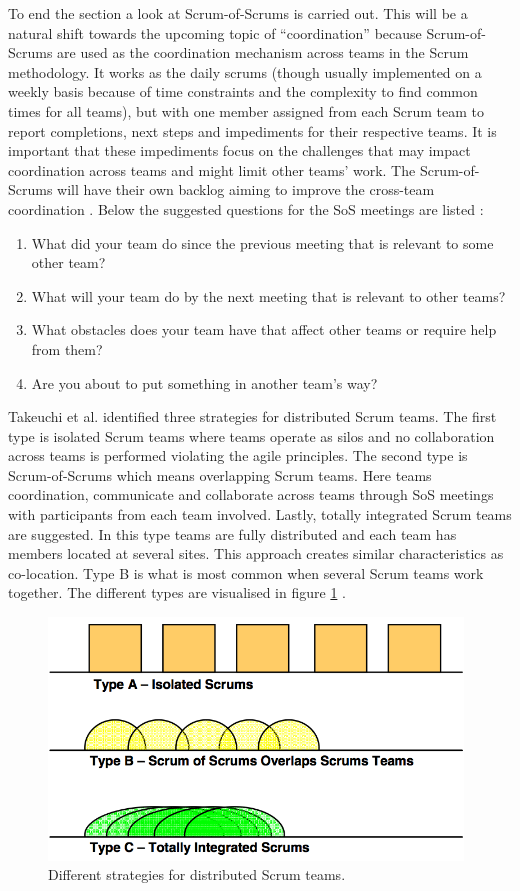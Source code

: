 To end the section a look at Scrum-of-Scrums is carried out. This will be a natural shift towards the upcoming topic of ``coordination'' because Scrum-of-Scrums are used as the coordination mechanism across teams in the Scrum methodology. It works as the daily scrums (though usually implemented on a weekly basis because of time constraints and the complexity to find common times for all teams), but with one member assigned from each Scrum team to report completions, next steps and impediments for their respective teams. It is important that these impediments focus on the challenges that may impact coordination across teams and might limit other teams' work. The Scrum-of-Scrums will have their own backlog aiming to improve the cross-team coordination \cite{Sutherland2001}. Below the suggested questions for the SoS meetings are listed \cite{Cohn2007}:

\begin{enumerate}
  \item What did your team do since the previous meeting that is relevant to some other team?
  \item What will your team do by the next meeting that is relevant to other teams?
  \item What obstacles does your team have that affect other teams or require help from them?
  \item Are you about to put something in another team's way?
\end{enumerate}

Takeuchi et al. identified three strategies for distributed Scrum teams. The first type is isolated Scrum teams where teams operate as silos and no collaboration across teams is performed violating the agile principles. The second type is Scrum-of-Scrums which means overlapping Scrum teams. Here teams coordination, communicate and collaborate across teams through SoS meetings with participants from each team involved. Lastly, totally integrated Scrum teams are suggested. In this type teams are fully distributed and each team has members located at several sites. This approach creates similar characteristics as co-location. Type B is what is most common when several Scrum teams work together. The different types are visualised in figure \ref{distributedscrum} \cite{takeuchi2004}.

\begin{figure}
\centering
\includegraphics[width=110mm]{images/distributed_scrum.png}
\caption{Different strategies for distributed Scrum teams.}
\label{distributedscrum}
\end{figure}


